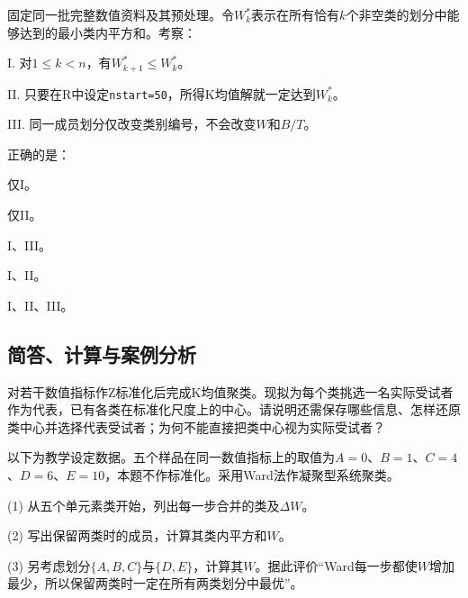 \par\noindent\begin{minipage}{\linewidth}
固定同一批完整数值资料及其预处理。令$W_k^\ast$表示在所有恰有$k$个非空类的划分中能够达到的最小类内平方和。考察：\par I. 对$1\le k<n$，有$W_{k+1}^\ast\le W_k^\ast$。\par II. 只要在R中设定\texttt{nstart=50}，所得K均值解就一定达到$W_k^\ast$。\par III. 同一成员划分仅改变类别编号，不会改变$W$和$B/T$。\par 正确的是：
\begin{choices}
\item 仅I。
\item 仅II。
\item I、III。
\item I、II。
\item I、II、III。
\end{choices}
\end{minipage}\par\medskip

\subsection{简答、计算与案例分析}

对若干数值指标作Z标准化后完成K均值聚类。现拟为每个类挑选一名实际受试者作为代表，已有各类在标准化尺度上的中心。请说明还需保存哪些信息、怎样还原类中心并选择代表受试者；为何不能直接把类中心视为实际受试者？

以下为教学设定数据。五个样品在同一数值指标上的取值为$A=0$、$B=1$、$C=4$、$D=6$、$E=10$，本题不作标准化。采用Ward法作凝聚型系统聚类。\par (1) 从五个单元素类开始，列出每一步合并的类及$\Delta W$。\par (2) 写出保留两类时的成员，计算其类内平方和$W$。\par (3) 另考虑划分$\{A,B,C\}$与$\{D,E\}$，计算其$W$。据此评价“Ward每一步都使$W$增加最少，所以保留两类时一定在所有两类划分中最优”。

